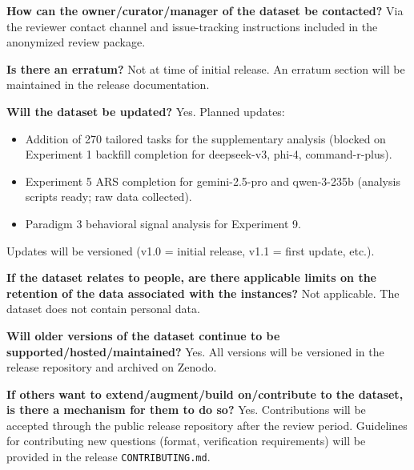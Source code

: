 \textbf{How can the owner/curator/manager of the dataset be contacted?}
Via the reviewer contact channel and issue-tracking instructions included in the
anonymized review package.

\textbf{Is there an erratum?}
Not at time of initial release. An erratum section will be maintained in the
release documentation.

\textbf{Will the dataset be updated?}
Yes. Planned updates:
\begin{itemize}
  \item Addition of 270 tailored tasks for the supplementary analysis (blocked on
    Experiment 1 backfill completion for deepseek-v3, phi-4, command-r-plus).
  \item Experiment 5 ARS completion for gemini-2.5-pro and qwen-3-235b
    (analysis scripts ready; raw data collected).
  \item Paradigm 3 behavioral signal analysis for Experiment 9.
\end{itemize}
Updates will be versioned (v1.0 = initial release, v1.1 = first update, etc.).

\textbf{If the dataset relates to people, are there applicable limits on the
retention of the data associated with the instances?}
Not applicable. The dataset does not contain personal data.

\textbf{Will older versions of the dataset continue to be supported/hosted/maintained?}
Yes. All versions will be versioned in the release repository and archived on
Zenodo.

\textbf{If others want to extend/augment/build on/contribute to the dataset, is
there a mechanism for them to do so?}
Yes. Contributions will be accepted through the public release repository after the
review period. Guidelines for contributing new questions (format, verification
requirements) will be provided in the release \texttt{CONTRIBUTING.md}.
